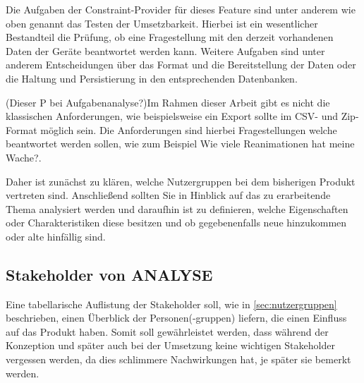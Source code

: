 Die Aufgaben der Constraint-Provider für dieses \gls{Feature} sind unter anderem wie oben genannt das Testen der Umsetzbarkeit.
Hierbei ist ein wesentlicher Bestandteil die Prüfung, ob eine Fragestellung mit den derzeit vorhandenen Daten der Geräte beantwortet werden kann.
Weitere Aufgaben sind unter anderem Entscheidungen über das Format und die Bereitstellung der Daten oder die Haltung und Persistierung in den entsprechenden Datenbanken.

(Dieser P bei Aufgabenanalyse?)Im Rahmen dieser Arbeit gibt es nicht die klassischen Anforderungen, wie beispielsweise \glqq ein Export sollte im CSV- und Zip-Format möglich sein\grqq. Die Anforderungen sind hierbei Fragestellungen welche beantwortet werden sollen, wie zum Beispiel \glqq Wie viele Reanimationen hat meine Wache?\grqq.

Daher ist zunächst zu klären, welche Nutzergruppen bei dem bisherigen Produkt vertreten sind.
Anschließend sollten Sie in Hinblick auf das zu erarbeitende Thema analysiert werden und daraufhin ist zu definieren, welche Eigenschaften oder Charakteristiken diese besitzen und ob gegebenenfalls neue hinzukommen oder alte hinfällig sind. 

\subsection{Stakeholder von \acrlong*{ANALYSE}}
\label{subsec:stakeholder}
Eine tabellarische Auflistung der Stakeholder soll, wie in \ref{sec:nutzergruppen} beschrieben, einen Überblick der Personen(-gruppen) liefern, die einen Einfluss auf das Produkt haben.
Somit soll gewährleistet werden, dass während der Konzeption und später auch bei der Umsetzung keine wichtigen Stakeholder vergessen werden, da dies schlimmere Nachwirkungen hat, je später sie bemerkt werden.


